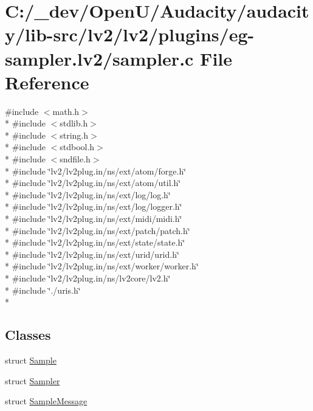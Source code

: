 \hypertarget{lv2_2lv2_2plugins_2eg-sampler_8lv2_2sampler_8c}{}\section{C\+:/\+\_\+dev/\+Open\+U/\+Audacity/audacity/lib-\/src/lv2/lv2/plugins/eg-\/sampler.lv2/sampler.c File Reference}
\label{lv2_2lv2_2plugins_2eg-sampler_8lv2_2sampler_8c}
{\ttfamily \#include $<$math.\+h$>$}\\*
{\ttfamily \#include $<$stdlib.\+h$>$}\\*
{\ttfamily \#include $<$string.\+h$>$}\\*
{\ttfamily \#include $<$stdbool.\+h$>$}\\*
{\ttfamily \#include $<$sndfile.\+h$>$}\\*
{\ttfamily \#include \char`\"{}lv2/lv2plug.\+in/ns/ext/atom/forge.\+h\char`\"{}}\\*
{\ttfamily \#include \char`\"{}lv2/lv2plug.\+in/ns/ext/atom/util.\+h\char`\"{}}\\*
{\ttfamily \#include \char`\"{}lv2/lv2plug.\+in/ns/ext/log/log.\+h\char`\"{}}\\*
{\ttfamily \#include \char`\"{}lv2/lv2plug.\+in/ns/ext/log/logger.\+h\char`\"{}}\\*
{\ttfamily \#include \char`\"{}lv2/lv2plug.\+in/ns/ext/midi/midi.\+h\char`\"{}}\\*
{\ttfamily \#include \char`\"{}lv2/lv2plug.\+in/ns/ext/patch/patch.\+h\char`\"{}}\\*
{\ttfamily \#include \char`\"{}lv2/lv2plug.\+in/ns/ext/state/state.\+h\char`\"{}}\\*
{\ttfamily \#include \char`\"{}lv2/lv2plug.\+in/ns/ext/urid/urid.\+h\char`\"{}}\\*
{\ttfamily \#include \char`\"{}lv2/lv2plug.\+in/ns/ext/worker/worker.\+h\char`\"{}}\\*
{\ttfamily \#include \char`\"{}lv2/lv2plug.\+in/ns/lv2core/lv2.\+h\char`\"{}}\\*
{\ttfamily \#include \char`\"{}./uris.\+h\char`\"{}}\\*
\subsection*{Classes}
\begin{DoxyCompactItemize}
\item 
struct \hyperlink{struct_sample}{Sample}
\item 
struct \hyperlink{struct_sampler}{Sampler}
\item 
struct \hyperlink{struct_sample_message}{Sample\+Message}
\end{DoxyCompactItemize}
